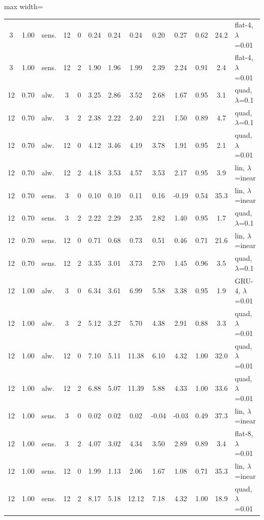 \begin{table}[htbp]
\begin{adjustbox}{max width=\textwidth}
\begin{tabular}{cclcc cccc c cc l}
3 & 1.00 & sens. & 12 & 0 & 0.24 & 0.24 & 0.24 & 0.20 & 0.27 & 0.62 & 24.2 & flat-4, $\lambda$=0.01 \\
3 & 1.00 & sens. & 12 & 2 & 1.90 & 1.96 & 1.99 & 2.39 & 2.24 & 0.91 & 2.4 & flat-4, $\lambda$=0.01 \\
12 & 0.70 & alw. & 3 & 0 & 3.25 & 2.86 & 3.52 & 2.68 & 1.67 & 0.95 & 3.1 & quad, $\lambda$=0.1 \\
12 & 0.70 & alw. & 3 & 2 & 2.38 & 2.22 & 2.40 & 2.21 & 1.50 & 0.89 & 4.7 & quad, $\lambda$=0.1 \\
12 & 0.70 & alw. & 12 & 0 & 4.12 & 3.46 & 4.19 & 3.78 & 1.91 & 0.95 & 2.1 & quad, $\lambda$=0.01 \\
12 & 0.70 & alw. & 12 & 2 & 4.18 & 3.53 & 4.57 & 3.53 & 2.17 & 0.95 & 3.9 & lin, $\lambda$=inear \\
12 & 0.70 & sens. & 3 & 0 & 0.10 & 0.10 & 0.11 & 0.16 & -0.19 & 0.54 & 35.3 & lin, $\lambda$=inear \\
12 & 0.70 & sens. & 3 & 2 & 2.22 & 2.29 & 2.35 & 2.82 & 1.40 & 0.95 & 1.7 & quad, $\lambda$=0.1 \\
12 & 0.70 & sens. & 12 & 0 & 0.71 & 0.68 & 0.73 & 0.51 & 0.46 & 0.71 & 21.6 & lin, $\lambda$=inear \\
12 & 0.70 & sens. & 12 & 2 & 3.35 & 3.01 & 3.73 & 2.70 & 1.45 & 0.96 & 3.5 & quad, $\lambda$=0.1 \\
12 & 1.00 & alw. & 3 & 0 & 6.34 & 3.61 & 6.99 & 5.58 & 3.38 & 0.95 & 1.9 & GRU-4, $\lambda$=0.01 \\
12 & 1.00 & alw. & 3 & 2 & 5.12 & 3.27 & 5.70 & 4.38 & 2.91 & 0.88 & 3.3 & quad, $\lambda$=0.01 \\
12 & 1.00 & alw. & 12 & 0 & 7.10 & 5.11 & 11.38 & 6.10 & 4.32 & 1.00 & 32.0 & quad, $\lambda$=0.01 \\
12 & 1.00 & alw. & 12 & 2 & 6.88 & 5.07 & 11.39 & 5.88 & 4.33 & 1.00 & 33.6 & quad, $\lambda$=0.01 \\
12 & 1.00 & sens. & 3 & 0 & 0.02 & 0.02 & 0.02 & -0.04 & -0.03 & 0.49 & 37.3 & lin, $\lambda$=inear \\
12 & 1.00 & sens. & 3 & 2 & 4.07 & 3.02 & 4.34 & 3.50 & 2.89 & 0.89 & 3.4 & flat-8, $\lambda$=0.01 \\
12 & 1.00 & sens. & 12 & 0 & 1.99 & 1.13 & 2.06 & 1.67 & 1.08 & 0.71 & 35.3 & lin, $\lambda$=inear \\
12 & 1.00 & sens. & 12 & 2 & 8.17 & 5.18 & 12.12 & 7.18 & 4.32 & 1.00 & 18.9 & quad, $\lambda$=0.01 \\
\bottomrule
\end{tabular}
\end{adjustbox}
\end{table}